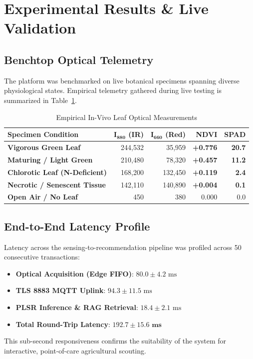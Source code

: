 \documentclass[9pt,twocolumn,a4paper,landscape]{article}
\begin{document}
\section{Experimental Results \& Live Validation}
\label{sec:results}

\subsection{Benchtop Optical Telemetry}
The platform was benchmarked on live botanical specimens spanning diverse physiological states. Empirical telemetry gathered during live testing is summarized in Table~\ref{tab:telemetry}.

\begin{table}[htbp]
\centering
\caption{Empirical In-Vivo Leaf Optical Measurements}
\label{tab:telemetry}
\small
\begin{tabular}{lrrrr}
\toprule
\textbf{Specimen Condition} & $\mathbf{I_{880}}$ \textbf{(IR)} & $\mathbf{I_{660}}$ \textbf{(Red)} & \textbf{NDVI} & \textbf{SPAD} \\
\midrule
\textbf{Vigorous Green Leaf} & 244,532 & 35,959 & \textbf{+0.776} & \textbf{20.7} \\
\textbf{Maturing / Light Green} & 210,480 & 78,320 & \textbf{+0.457} & \textbf{11.2} \\
\textbf{Chlorotic Leaf (N-Deficient)} & 168,200 & 132,450 & \textbf{+0.119} & \textbf{2.4} \\
\textbf{Necrotic / Senescent Tissue} & 142,110 & 140,890 & \textbf{+0.004} & \textbf{0.1} \\
\textbf{Open Air / No Leaf} & 450 & 380 & 0.000 & 0.0 \\
\bottomrule
\end{tabular}
\end{table}

\subsection{End-to-End Latency Profile}
Latency across the sensing-to-recommendation pipeline was profiled across 50 consecutive transactions:
\begin{itemize}[leftmargin=*]
    \item \textbf{Optical Acquisition (Edge FIFO)}: $80.0 \pm 4.2\text{ ms}$
    \item \textbf{TLS 8883 MQTT Uplink}: $94.3 \pm 11.5\text{ ms}$
    \item \textbf{PLSR Inference \& RAG Retrieval}: $18.4 \pm 2.1\text{ ms}$
    \item \textbf{Total Round-Trip Latency}: $\mathbf{192.7 \pm 15.6\text{ ms}}$
\end{itemize}
This sub-second responsiveness confirms the suitability of the system for interactive, point-of-care agricultural scouting.
\end{document}
